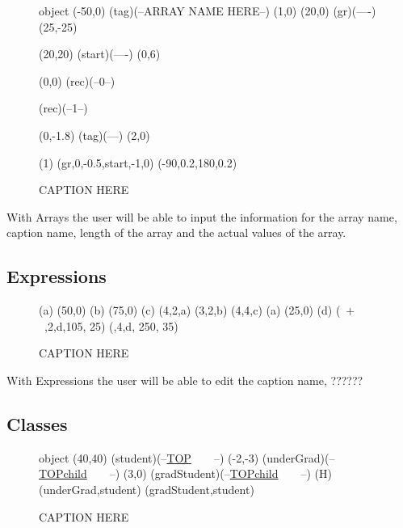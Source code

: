 \documentclass[10pt,a4paper,english]{article}
\begin{document}
\begin {figure}[!htbp]

\Draw

 {object}
\Move(-50,0)
\Node(tag)(--ARRAY NAME HERE--)
\MoveToExit(1,0)
\Move(20,0)
\ORectNode(gr)(----)
\Move (25,-25)

\MinNodeSize(20,20)
\Node(start)(----)
\Do(0,6)
{  
	\IF 
    	\EqInt(0,0) 				
        	\THEN
 				\RectNode(rec)(--0--)
            
   \ELSE
   		\RectNode(rec)(--1--)
   		
 		   \FI
   { 	\MoveToExit(0,-1.8)
 	\Node(tag)(--\DoReg--)
   }
   \MoveToExit(2,0)
}
\ArrowHeads(1)
\CurvedEdgeAt(gr,0,-0.5,start,-1,0) (-90,0.2,180,0.2)
\EndDraw
\caption {CAPTION HERE}
\label {fig:array}
\end {figure}

With Arrays the user will be able to input the information for the array name, caption name, length of the array and the actual values of the array.  

\subsection*{Expressions}

\begin {figure}[!htbp]
\Draw


\MarkLoc(a)
\Move(50,0)
\MarkLoc(b)
\Move(75,0)
\MarkLoc(c)
\boxItDefault(4,2,a)
\boxItDefault(3,2,b)
\boxItDefault(4,4,c)
\MoveToLoc(a)
\Move(25,0)
\MarkLoc(d)
\boxIt(~$  +  $~,2,d,105, 25)
\boxIt(\hspace{135pt}\hfill*\hspace{10pt},4,d, 250, 35)
\EndDraw
\caption {CAPTION HERE }
\label {fig:exprsBoxedAmb1}
\end {figure}

With Expressions the user will be able to edit the caption name, ??????

\subsection*{Classes}

\begin {figure}[!htbp]
\Draw
 {object}
\MinNodeSize(40,40)
\RectNode (student)(--\underline {TOP}~~~~--)
\MoveToExit(-2,-3)
\RectNode (underGrad)(--\underline {TOPchild}~~~~--)
\MoveToExit(3,0)
\RectNode (gradStudent)(--\underline {TOPchild}~~~~--)
\ArrowSpec (H)
\Edge(underGrad,student)
\Edge(gradStudent,student)
\EndDraw
\caption {CAPTION HERE}
\label {fig:studentClasses}
\end {figure}
\end{document}
